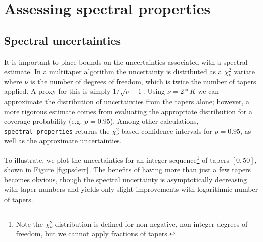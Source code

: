 \documentclass{article}\usepackage{graphicx, color}
\newcommand{\Rcmd}[1]{\texttt{#1}}
\begin{document}

\section{Assessing spectral properties}
\subsection{Spectral uncertainties}
It is important to place bounds on the uncertainties associated
with a spectral estimate.
In a multitaper algorithm the uncertainty is distributed as
a $\chi{}_{\nu}^2$ variate where $\nu$ is
the number of degrees of freedom, which is twice the
number of tapers applied.
A proxy for this is simply $1/\sqrt{\nu - 1}$.
Using $\nu = 2*K$ we can approximate the distribution
of uncertainties from the tapers alone; however, a more
rigorous estimate comes from evaluating the appropriate 
distribution  for a coverage probability (e.g. $p=0.95$).
Among other calculations, \Rcmd{spectral\_properties} returns the 
$\chi{}_{\nu}^2$ based confidence intervals for $p=0.95$, as well as the
approximate uncertainties.  

To illustrate, we 
plot the uncertainties for an integer sequence\footnote{
Note the $\chi{}_{\nu}^2$ distribution is defined for non-negative,
non-integer degrees of freedom, but we cannot apply
fractions of tapers.} of tapers $[0, 50]$, shown in
Figure \ref{fig:psderr}.  The benefits of having more than just
a few tapers becomes obvious, though the spectral uncertainty
is asymptotically decreasing with taper numbers and yields
only slight improvements with logarithmic number of tapers.
\end{document}
